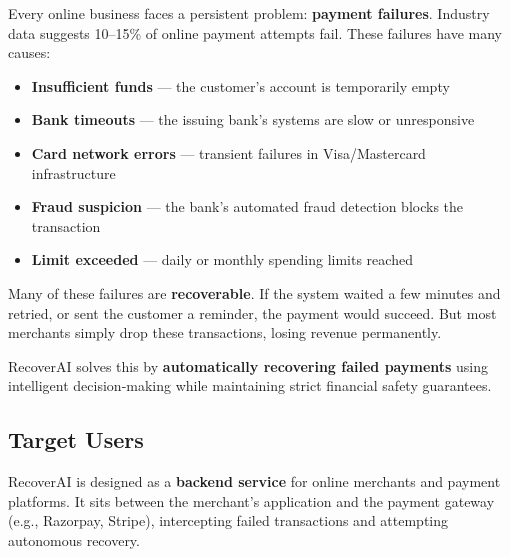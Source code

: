 \begin{tcolorbox}[infobox={\iconWarning[1.3] The Revenue Leakage Problem}]
\color{textdark}
Every online business faces a persistent problem: \textbf{payment failures}. Industry data suggests 10--15\% of online payment attempts fail. These failures have many causes:

\begin{itemize}
    \item \textbf{Insufficient funds} --- the customer's account is temporarily empty
    \item \textbf{Bank timeouts} --- the issuing bank's systems are slow or unresponsive
    \item \textbf{Card network errors} --- transient failures in Visa/Mastercard infrastructure
    \item \textbf{Fraud suspicion} --- the bank's automated fraud detection blocks the transaction
    \item \textbf{Limit exceeded} --- daily or monthly spending limits reached
\end{itemize}

Many of these failures are \textbf{recoverable}. If the system waited a few minutes and retried, or sent the customer a reminder, the payment would succeed. But most merchants simply drop these transactions, losing revenue permanently.

RecoverAI solves this by \textbf{automatically recovering failed payments} using intelligent decision-making while maintaining strict financial safety guarantees.
\end{tcolorbox}

\vspace{0.5cm}

\subsection{Target Users}

RecoverAI is designed as a \textbf{backend service} for online merchants and payment platforms. It sits between the merchant's application and the payment gateway (e.g., Razorpay, Stripe), intercepting failed transactions and attempting autonomous recovery.

